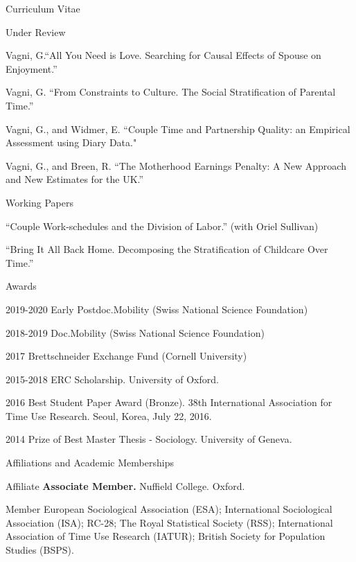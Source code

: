 \documentclass[12pt,a4paper]{article}
\begin{document}
\begin{cv}{Curriculum Vitae}
 \begin{cvlist}{Under Review}
 
   \item Vagni, G.``All You Need is Love. Searching for Causal Effects of Spouse on Enjoyment.'' 	
 	\item Vagni, G. ``From Constraints to Culture. The Social Stratification of Parental Time.'' 
 	\item Vagni, G., and Widmer, E. ``Couple Time and Partnership Quality: an Empirical Assessment using Diary Data."
 	\item Vagni, G., and Breen, R. ``The Motherhood Earnings Penalty: A New Approach and New
 	Estimates for the UK.''
  \end{cvlist}
 
 \begin{cvlist}{Working Papers}
  	\item ``Couple Work-schedules and the Division of Labor.'' (with Oriel Sullivan)
  	\item ``Bring It All Back Home. Decomposing the Stratification of Childcare Over Time.''
\end{cvlist}
 
  \begin{cvlist}{Awards}
  	\item[2019-2020]  Early Postdoc.Mobility (Swiss National Science Foundation)
  	\item[2018-2019]  Doc.Mobility (Swiss National Science Foundation)
  	\item[2017]  Brettschneider Exchange Fund (Cornell University)
  	\item [2015-2018] ERC Scholarship. University of Oxford. 
  	\item [2016]  Best Student Paper Award (Bronze). 38th International Association for Time Use Research. Seoul, Korea, July 22, 2016. 
  	\item [2014] Prize of Best Master Thesis - Sociology.  University of Geneva. 
  \end{cvlist}
  
\begin{cvlist}{Affiliations and Academic Memberships}
	\item[Affiliate] \textbf{Associate Member.} Nuffield College. Oxford. 
	\item[Member] European Sociological Association (ESA); International Sociological Association (ISA); RC-28; The Royal Statistical Society (RSS); International Association of Time Use Research (IATUR); 
	British Society for Population Studies (BSPS). 
\end{cvlist}


\end{cv}
\end{document}

